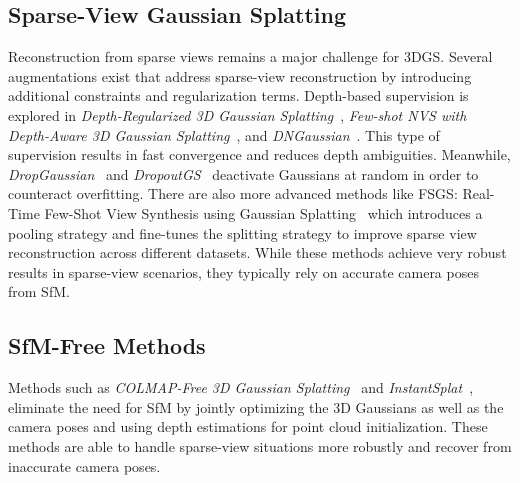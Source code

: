 \subsection{Sparse-View Gaussian Splatting}
Reconstruction from sparse views remains a major challenge for 3DGS.
Several augmentations exist that address sparse-view reconstruction by introducing additional constraints and regularization terms.
Depth-based supervision is explored in \textit{Depth-Regularized 3D Gaussian Splatting}~\cite{depthreg3dgs},
\textit{Few-shot NVS with Depth-Aware 3D Gaussian Splatting}~\cite{few-shotNVS3DGS}, and
\textit{DNGaussian}~\cite{DNGaussian}. This type of supervision results in fast convergence and reduces depth ambiguities.
Meanwhile, \textit{DropGaussian}~\cite{DropGaussian} and \textit{DropoutGS}~\cite{DropoutGS}
deactivate Gaussians at random in order to counteract overfitting.
There are also more advanced methods like FSGS: Real-Time Few-Shot View Synthesis using Gaussian Splatting~\cite{fsgs} which
introduces a pooling strategy and fine-tunes the splitting strategy to improve sparse view reconstruction across different datasets.
While these methods achieve very robust results in sparse-view scenarios, they typically rely on accurate camera poses from SfM.

\subsection{SfM-Free Methods}
Methods such as \textit{COLMAP-Free 3D Gaussian Splatting}~\cite{COLMAPFREE3DGS}
and \textit{InstantSplat}~\cite{InstantSplat}, eliminate the need for SfM by jointly optimizing the 3D Gaussians
as well as the camera poses and using depth estimations for point cloud initialization. These methods are able to
handle sparse-view situations more robustly and recover from inaccurate camera poses.

